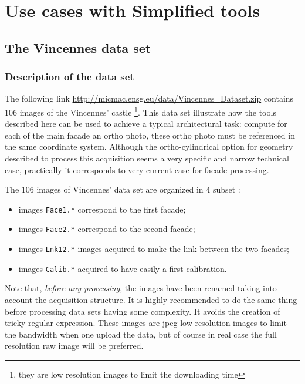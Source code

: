 \chapter{Use cases with Simplified tools}



\section{The Vincennes data set}


\subsection{Description of the data set}
\label{Vincennes:DataSet}

The following link \url{http://micmac.ensg.eu/data/Vincennes_Dataset.zip} contains
$106$ images of the Vincennes' castle \footnote{they are low resolution images
to limit the  downloading time}. This data set illustrate how
the tools described here can be used to achieve a typical architectural task:
compute for each of the main facade an ortho photo, these ortho photo
must be referenced in the same coordinate system.  Although the ortho-cylindrical
option for geometry described to process this acquisition seems a very specific
and narrow technical case, practically it corresponds to very current case
for facade processing.


The $106$ images of Vincennes' data set are organized in $4$ subset :


\begin{itemize}
   \item  images {\tt Face1.*} correspond to the first facade;
   \item  images {\tt Face2.*} correspond to the second facade;
   \item  images {\tt  Lnk12.*} images acquired to make the link between
           the two facades;
   \item  images {\tt  Calib.*} acquired to have easily a first
           calibration.
\end{itemize}

Note that, \emph{before any processing}, the images have been renamed taking
into account the acquisition structure. It is highly recommended to do the
same thing before processing data sets having some complexity. It avoids
the creation of tricky regular expression. These images are jpeg low resolution
images to limit the bandwidth when one upload the data, but of course in
real case the full resolution raw image will be preferred.


